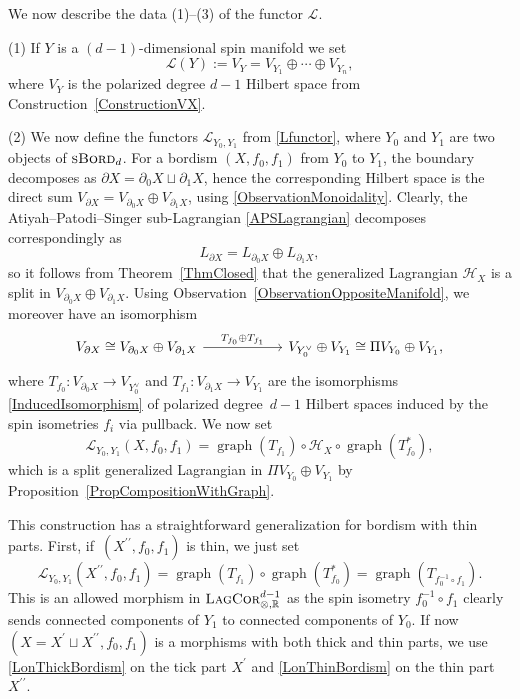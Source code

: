 \documentclass[pdftex]{sigma}
\numberwithin{equation}{section}
\DeclareMathOperator{\graph}{\mathrm{graph}}
\newcommand{\LagCor}{\textsc{LagCor}}
\newcommand{\R}{\mathbb{R}}
\newcommand{\sBord}{\textsc{sBord}}
\begin{document}
We now describe the data (1)--(3) of the functor $\mathcal{L}$.

(1) If $Y$ is a $(d-1)$-dimensional spin manifold we set
\begin{equation*}
\mathcal{L}(Y) := V_Y = V_{Y_1} \oplus \cdots \oplus V_{Y_n},
\end{equation*}
where $V_Y$ is the polarized degree $d-1$ Hilbert space from Construction~\ref{ConstructionVX}.

(2)
We now define the functors $\mathcal{L}_{Y_0, Y_1}$ from \eqref{Lfunctor}, where $Y_0$ and $Y_1$ are two objects of $\sBord_d$.
For a bordism $(X, f_0, f_1)$ from $Y_0$ to $Y_1$, the boundary decomposes as $\partial X = \partial_0 X \sqcup \partial_1 X$, hence the corresponding Hilbert space is the direct sum $V_{\partial X} = V_{\partial_0 X} \oplus V_{\partial_1 X}$, using \eqref{ObservationMonoidality}.
Clearly, the Atiyah--Patodi--Singer sub-Lagrangian \eqref{APSLagrangian} decomposes correspondingly as
\begin{equation*}
 L_{\partial X} = L_{\partial_0 X} \oplus L_{\partial_1 X},
\end{equation*}
so it follows from Theorem~\ref{ThmClosed} that the generalized Lagrangian $\mathcal{H}_X$ is a split in $V_{\partial_0 X} \oplus V_{\partial_1 X}$.
Using Observation~\ref{ObservationOppositeManifold}, we moreover have an isomorphism
\begin{equation*}
\begin{tikzcd}[column sep=2cm]
V_{\partial X} \cong V_{\partial_0 X} \oplus V_{\partial_1 X}
\ar[r, "T_{f_0} \oplus T_{f_1}"] &
V_{Y_0^\vee} \oplus V_{Y_1} \cong \Pi V_{Y_0} \oplus V_{Y_1},
\end{tikzcd}
\end{equation*}
where $T_{f_0}\colon V_{\partial_0 X} \to V_{Y_0^\vee}$ and $T_{f_1}\colon V_{\partial_1 X} \to V_{Y_1}$ are the isomorphisms \eqref{InducedIsomorphism} of polarized degree~${d-1}$ Hilbert spaces induced by the spin isometries $f_i$ via pullback.
We now set
\begin{equation}
\label{LonThickBordism}
 \mathcal{L}_{Y_0, Y_1}(X, f_0, f_1) = \graph(T_{f_1}) \circ \mathcal{H}_X \circ \graph(T_{f_0}^*),
\end{equation}
which is a split generalized Lagrangian in $\Pi V_{Y_0} \oplus V_{Y_1}$ by Proposition~\ref{PropCompositionWithGraph}.

This construction has a straightforward generalization for bordism with thin parts.
First, if~$(X^{\prime\prime}, f_0, f_1)$ is thin, we just set
\begin{equation}
\label{LonThinBordism}
 \mathcal{L}_{Y_0, Y_1}(X^{\prime\prime}, f_0, f_1) = \graph(T_{f_1}) \circ \graph(T_{f_0}^*) = \graph(T_{f_0^{-1} \circ f_1}).
\end{equation}
This is an allowed morphism in $\LagCor_{\otimes, \R}^{d-1}$ as the spin isometry $f_0^{-1} \circ f_1$ clearly sends connected components of $Y_1$ to connected components of $Y_0$.
If now $(X = X^\prime \sqcup X^{\prime\prime}, f_0, f_1)$ is a morphisms with both thick and thin parts, we use \eqref{LonThickBordism} on the tick part $X^\prime$ and \eqref{LonThinBordism} on the thin part $X^{\prime\prime}$.
\end{document}
